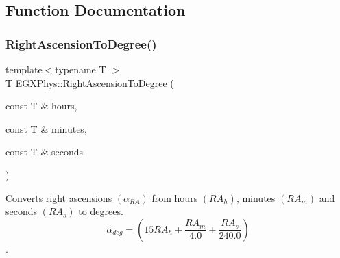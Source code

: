 \subsection{Function Documentation}
\mbox{\label{group___e_g_x_phys-_right_ascension_and_declination_ga30e95e529dac871efc014c8ca0108c0d}} 
\subsubsection{\texorpdfstring{Right\+Ascension\+To\+Degree()}{RightAscensionToDegree()}}
{\footnotesize\ttfamily template$<$typename T $>$ \\
T E\+G\+X\+Phys\+::\+Right\+Ascension\+To\+Degree (\begin{DoxyParamCaption}\item[{const T \&}]{hours,  }\item[{const T \&}]{minutes,  }\item[{const T \&}]{seconds }\end{DoxyParamCaption})}



Converts right ascensions $(\alpha_{RA})$ from hours $(RA_h)$, minutes $(RA_m)$ and seconds $(RA_s)$ to degrees. \[\alpha_{deg}=(15 RA_h + \frac{RA_m}{4.0} + \frac{RA_s}{240.0})\]. 

